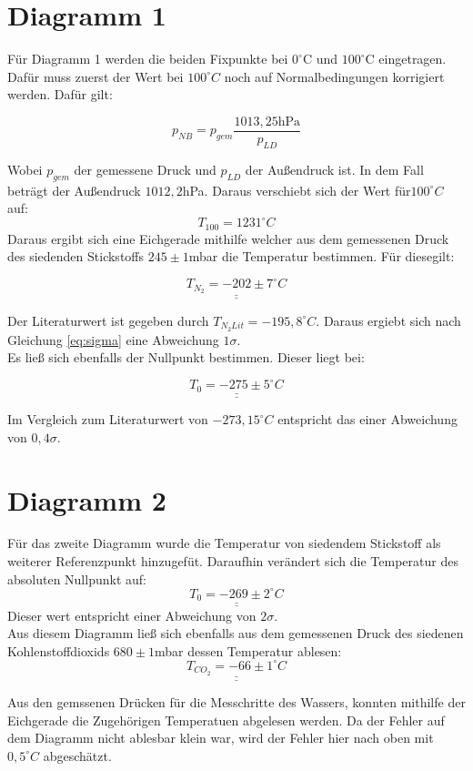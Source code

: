 \setcounter{equation}{3}
\section{Diagramm 1}

Für Diagramm 1 werden die beiden Fixpunkte bei $0^\circ$C und $100^\circ$C eingetragen.
Dafür muss zuerst der Wert bei $100^\circ C$ noch auf Normalbedingungen korrigiert werden.
Dafür gilt:

\begin{equation}
    p_{NB} = p_{gem} \frac{1013,25 \text{hPa}}{p_{LD}}
\end{equation}

Wobei $p_{gem}$ der gemessene Druck und $p_{LD}$ der Außendruck ist. In dem Fall beträgt der Außendruck $1012,2$hPa.
Daraus verschiebt sich der Wert für$100^\circ C$ auf:
\[T_{100} = 1231 ^\circ C\]
Daraus ergibt sich eine Eichgerade mithilfe welcher aus dem gemessenen Druck
des siedenden Stickstoffs $245 \pm 1$mbar die Temperatur bestimmen. Für diesegilt:

\[\underline{\underline{T_{N_2} = -202 \pm 7 ^\circ C}}\]

Der Literaturwert ist gegeben durch $T_{N_2 Lit} = -195, 8 ^\circ C$. Daraus ergiebt sich
nach Gleichung \ref{eq:sigma}  eine Abweichung $1 \sigma$.\\
Es ließ sich ebenfalls der Nullpunkt bestimmen. Dieser liegt bei:

\[\underline{\underline{T_0= -275 \pm 5 ^\circ C}}\]

Im Vergleich zum Literaturwert von $-273,15^\circ C$  entspricht das einer Abweichung von $0,4 \sigma$.

\section{Diagramm 2}
Für das zweite Diagramm wurde die Temperatur von siedendem Stickstoff als weiterer Referenzpunkt hinzugefüt.
Daraufhin verändert sich die Temperatur des absoluten Nullpunkt auf:
\[ \underline{\underline{T_0 = -269 \pm 2 ^\circ C}}\]
Dieser wert entspricht einer Abweichung von $2 \sigma$.\\
Aus diesem Diagramm ließ sich ebenfalls aus dem gemessenen Druck des siedenen Kohlenstoffdioxids $680\pm 1$mbar dessen
Temperatur ablesen:
\[\underline{\underline{T_{CO_2}= - 66 \pm 1 ^\circ C}}\]

Aus den gemssenen Drücken für die Messchritte des Wassers, konnten mithilfe der Eichgerade die Zugehörigen Temperatuen abgelesen werden.
Da der Fehler auf dem Diagramm nicht ablesbar klein war, wird der Fehler hier nach oben mit $0,5 ^\circ C$ abgeschätzt.

